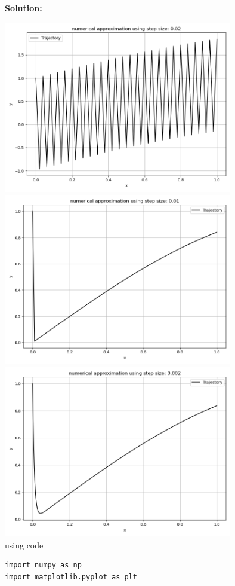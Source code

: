 \documentclass[a4paper,12pt]{scrartcl} %
\newenvironment{solution}
  {\par\color{answercolor}\textbf{Solution:}\ }
  {\par}
\theoremstyle{darktheorem}
\begin{document}
\begin{solution}
\begin{enumerate}
\begin{enumerate}
            \includegraphics[width = 10cm]{FE_STEP0.02.png}\\
            \includegraphics[width = 10cm]{FE_STEP0.01.png}\\
            \includegraphics[width = 10cm]{FE_STEP0.002.png}\\
            using code
            \begin{lstlisting}
import numpy as np
import matplotlib.pyplot as plt


\end{lstlisting}
\end{enumerate}
\end{enumerate}
\end{solution}
\end{document}
